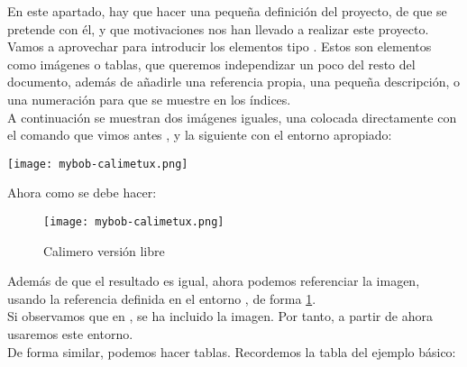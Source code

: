 \newpage

En este apartado, hay que hacer una pequeña definición del proyecto,
de que se pretende con él, y que motivaciones nos han llevado a
realizar este proyecto.\\

Vamos a aprovechar para introducir los elementos tipo
. Estos son elementos como imágenes o tablas, que
queremos independizar un poco del resto del documento, además de
añadirle una referencia propia, una pequeña descripción, o una
numeración para que se muestre en los índices.\\

A continuación se muestran dos imágenes iguales, una colocada
directamente con el comando que vimos antes
, y la siguiente con el entorno
apropiado:

\begin{center}
\texttt{[image: mybob-calimetux.png]}
\end{center}

Ahora como se debe hacer:

\begin{figure}[H] %
  
  \label{cal-tux} %
  \begin{center}
    \texttt{[image: mybob-calimetux.png]}
  \end{center}
  \caption{Calimero versión libre}
\end{figure}

Además de que el resultado es igual, ahora podemos referenciar la
imagen, usando la referencia definida en el entorno ,
de forma \ref{cal-tux}. \\

Si observamos que en , se ha incluido
la imagen. Por tanto, a partir de ahora usaremos este entorno.\\

De forma similar, podemos hacer tablas. Recordemos la tabla del
ejemplo básico:

